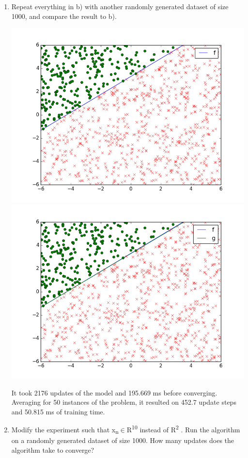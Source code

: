 \documentclass{article}
\begin{document}
\begin{enumerate}[label=(\alph*)]
\item Repeat everything in b) with another randomly generated dataset of size 1000, and compare the result to b).
\begin{center}
\includegraphics[scale=0.35]{images/5_a.png} 
\includegraphics[scale=0.35]{images/5_b.png} 
\end{center}
It took 2176 updates of the model and 195.669 ms before converging.\\
Averaging for 50 instances of the problem, it resulted on 452.7 update steps and 50.815 ms of training time.

\item Modify the experiment such that x\textsubscript{n}$\in$R\textsuperscript{10} instead of R\textsuperscript{2} . Run the algorithm on a randomly generated dataset of size 1000. How many updates does the algorithm take to converge?


\end{enumerate}
\end{document}
